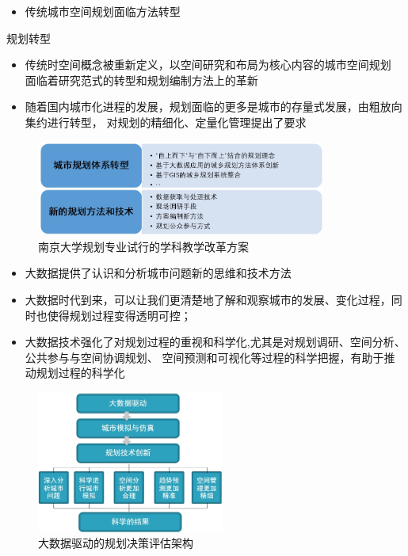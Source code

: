 \documentclass{beamerthemeMono}
\begin{document}
\begin{frame}[t]{\subsecname}
\begin{itemize}
\item 传统城市空间规划面临方法转型
\end{itemize}

\begin{commonbox}{规划转型} 
\begin{itemize} 
\item 传统时空间概念被重新定义，以空间研究和布局为核心内容的城市空间规划
面临着研究范式的转型和规划编制方法上的革新
\item 随着国内城市化进程的发展，规划面临的更多是城市的存量式发展，由粗放向集约进行转型，
对规划的精细化、定量化管理提出了要求
\end{itemize}
\end{commonbox}
\begin{figure}
  \centering
  \includegraphics[width=0.85\textwidth]{chp01_规划转型.jpg}
  \caption{南京大学规划专业试行的学科教学改革方案}
\end{figure}
\end{frame}

\begin{frame}[t]{\subsecname}
\begin{itemize}
\item 大数据提供了认识和分析城市问题新的思维和技术方法
\item 大数据时代到来，可以让我们更清楚地了解和观察城市的发展、变化过程，同时也使得规划过程变得透明可控；
\item 大数据技术强化了对规划过程的重视和科学化,尤其是对规划调研、空间分析、公共参与与空间协调规划、
空间预测和可视化等过程的科学把握，有助于推动规划过程的科学化
\end{itemize}
\begin{figure}
  \centering
  \includegraphics[width=0.55\textwidth]{chp01_数据驱动的城市规划.jpg}
  \caption{大数据驱动的规划决策评估架构}
\end{figure}
\end{frame}
\end{document}
